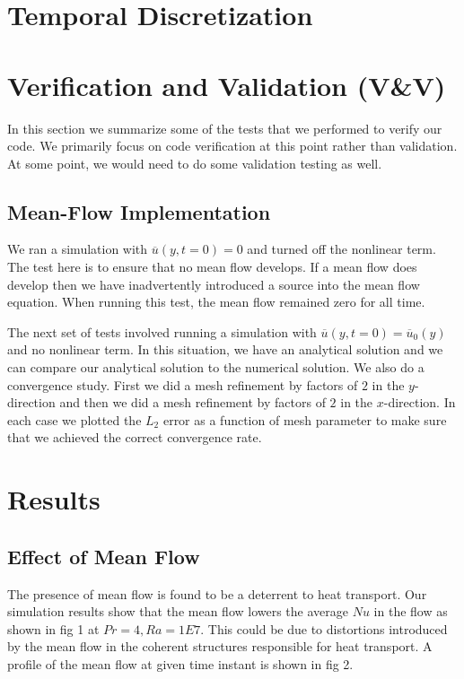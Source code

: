\documentclass[12pt]{article}
\newcommand{\lr}[1]{\left(#1\right)}
\newcommand{\ua}{\overline{u}}
\begin{document}
  \section{Temporal Discretization}

  \section{Verification and Validation (V\&V)}
  In this section we summarize some of the tests that we performed to verify our code.  We 
  primarily focus on code verification at this point rather than validation.  At some point, 
  we would need to do some validation testing as well.

  \subsection{Mean-Flow Implementation}
    We ran a simulation with $\ua\lr{y,t=0} = 0$ and turned off the nonlinear term.  The 
    test here is to ensure that no mean flow develops.  If a mean flow does develop then 
    we have inadvertently introduced a source into the mean flow equation.  When running 
    this test, the mean flow remained zero for all time.

    The next set of tests involved running a simulation with $\ua\lr{y,t=0} = \ua_{0}\lr{y}$ 
    and no nonlinear term.  In this situation, we have an analytical solution and we can 
    compare our analytical solution to the numerical solution.  We also do a convergence 
    study.  First we did a mesh refinement by factors of $2$ in the $y$-direction and 
    then we did a mesh refinement by factors of $2$ in the $x$-direction.  In each case 
    we plotted the $L_{2}$ error as a function of mesh parameter to make sure that we 
    achieved the correct convergence rate.
    
     \section{Results}
     \subsection{Effect of Mean Flow}
     The presence of mean flow is found to be a deterrent to heat transport. Our simulation results show that the mean flow lowers the average $Nu$ in the flow as shown in fig 1 at $Pr = 4, Ra = 1E7$. This could be due to distortions introduced by the mean flow in the coherent structures responsible for heat transport. A profile of the mean flow at given time instant is shown in fig 2.
     
\end{document}
